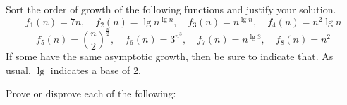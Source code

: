 \documentclass[a4paper]{exam}
\begin{document}
\begin{questions}
  
\question[10]
  Sort the order of growth of the following functions and justify your solution.
  \[
    f_1(n) = 7n,\quad f_2(n) = \lg n^{\lg n},\quad f_3(n) = n^{\lg n},\quad f_4(n) = n^2\lg n
  \]
  \[
    f_5(n) = \left(\frac{n}{2}\right)^{\frac{n}{2}},\quad f_6(n) = 3^{n^3},\quad f_7(n) = n^{\lg 3},\quad f_8(n) = n^2
  \]
  If some have the same asymptotic growth, then be sure to indicate that. As usual, $\lg$ indicates a base of 2.
    \begin{solution}
      
    \end{solution}

\question
  Prove or disprove each of the following:


\end{questions}
\end{document}
